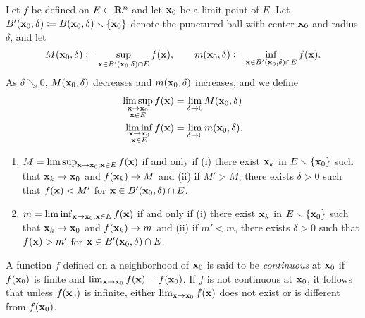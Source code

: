 Let $f$ be defined on $E\subset\mathbf{R}^n$ and let $\mathbf{x}_0$ be a limit point of
$E$. Let $B'(\mathbf{x}_0,\delta)\coloneqq B(\mathbf{x}_0,\delta)\smallsetminus\{\mathbf{x}_0\}$
denote the punctured ball with center $\mathbf{x}_0$ and radius $\delta$, and let
\begin{equation}
\label{eq:sup-inf-ball}
M(\mathbf{x}_0,\delta)\coloneqq\sup_{\mathbf{x}\in B'(\mathbf{x}_0,\delta)\cap E}
f(\mathbf{x}),\qquad
m(\mathbf{x}_0,\delta)\coloneqq\inf_{\mathbf{x}\in B'(\mathbf{x}_0,\delta)\cap E}
f(\mathbf{x}).
\end{equation}
As $\delta\searrow 0$, $M(\mathbf{x}_0,\delta)$ decreases and $m(\mathbf{x}_0,\delta)$
increases, and we define
\begin{equation}
  \label{eq:ball-limsup-liminf}
\begin{aligned}
\limsup_{\substack{\mathbf{x}\to\mathbf{x}_0\\\mathbf{x}\in E}} f(\mathbf{x})
&=\lim_{\delta\to 0}M(\mathbf{x}_0,\delta)\\
\liminf_{\substack{\mathbf{x}\to\mathbf{x}_0\\\mathbf{x}\in E}} f(\mathbf{x})
&=\lim_{\delta\to 0}m(\mathbf{x}_0,\delta).
\end{aligned}
\end{equation}
\begin{theorem}[1.14]
\begin{enumerate}[label=\textnormal{(\alph*)}]
\item $M=\limsup_{\mathbf{x}\to\mathbf{x}_0;\mathbf{x}\in E} f(\mathbf{x})$ if and only if
  \textnormal{(i)} there exist ${\mathbf{x}_k}$ in $E\smallsetminus\{\mathbf{x}_0\}$ such that
  $\mathbf{x}_k\to\mathbf{x}_0$ and $f(\mathbf{x}_k)\to M$ and \textnormal{(ii)} if $M'>M$,
  there exists $\delta>0$ such that $f(\mathbf{x})<M'$ for $\mathbf{x}\in
  B'(\mathbf{x}_0,\delta)\cap E$.
\item $m=\liminf_{\mathbf{x}\to\mathbf{x}_0;\mathbf{x}\in E} f(\mathbf{x})$ if and only if
  \textnormal{(i)} there exist ${\mathbf{x}_k}$ in $E\smallsetminus\{\mathbf{x}_0\}$ such that
  $\mathbf{x}_k\to\mathbf{x}_0$ and $f(\mathbf{x}_k)\to m$ and \textnormal{(ii)} if $m'<m$,
  there exists $\delta>0$ such that $f(\mathbf{x})>m'$ for $\mathbf{x}\in
  B'(\mathbf{x}_0,\delta)\cap E$.
\end{enumerate}
\end{theorem}

A function $f$ defined on a neighborhood of $\mathbf{x}_0$ is said to be
\emph{continuous} at $\mathbf{x}_0$ if $f(\mathbf{x}_0)$ is finite and
$\lim_{\mathbf{x}\to\mathbf{x}_0}f(\mathbf{x})=f(\mathbf{x}_0)$. If $f$ is not continuous at
$\mathbf{x}_0$, it follows that unless $f(\mathbf{x}_0)$ is infinite, either
$\lim_{\mathbf{x}\to\mathbf{x}_0} f(\mathbf{x})$ does not exist or is different from
$f(\mathbf{x}_0)$.

